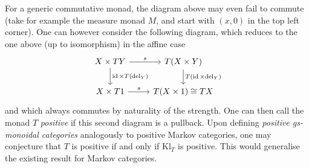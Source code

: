 \documentclass[a4paper,UKenglish,numberwithinsect,cleveref, autoref, thm-restate]{lipics-v2021}
\theoremstyle{plain} %
\theoremstyle{definition} %
\begin{document}
For a generic commutative monad, the diagram above may even fail to commute (take for example the measure monad $M$, and start with $(x,0)$ in the top left corner). One can however consider the following diagram, which reduces to the one above (up to isomorphism) in the affine case
\[
 \begin{tikzcd}
   X \times TY \ar{d}{\id\times T(\mathrm{del}_{Y})} \ar{r}{s} & T(X\times Y) \ar{d}{T(\id\times \mathrm{del}_Y)} \\
   X \times T1 \ar{r}{s} & T(X\times 1) \cong TX
  \end{tikzcd}
\]
and which always commutes by naturality of the strength.
One can then call the monad $T$ \emph{positive} if this second diagram is a pullback. Upon defining \emph{positive gs-monoidal categories} analogously to positive Markov categories, one may conjecture that $T$ is positive if and only if $\mathrm{Kl}_T$ is positive.
This would generalise the existing result for Markov categories.



\end{document}
